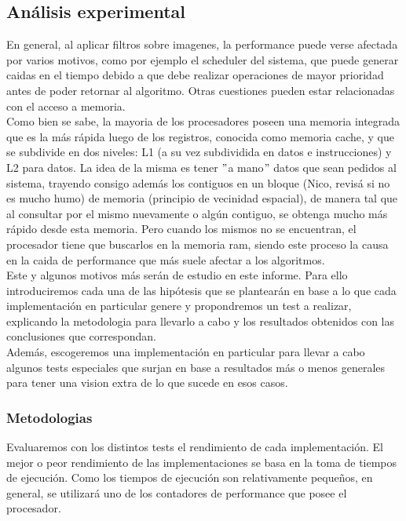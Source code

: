\subsection{Análisis experimental}

En general, al aplicar filtros sobre imagenes, la performance puede verse afectada por varios motivos, como por ejemplo el scheduler del sistema, que puede generar caidas en el tiempo debido a que debe realizar operaciones de mayor prioridad antes de poder retornar al algoritmo. Otras cuestiones pueden estar relacionadas con el acceso a memoria.\\

Como bien se sabe, la mayoria de los procesadores poseen una memoria integrada que es la más rápida luego de los registros, conocida como memoria cache, y que se subdivide en dos niveles: L1 (a su vez subdividida en datos e instrucciones) y L2 para datos. 
La idea de la misma es tener $"$a mano$"$ datos que sean pedidos al sistema, trayendo consigo además los contiguos en un bloque (Nico, revisá si no es mucho humo) de memoria (principio de vecinidad espacial), de manera tal que al consultar por el mismo nuevamente o algún contiguo, se obtenga mucho más rápido desde esta memoria. Pero cuando los mismos no se encuentran, el procesador tiene que buscarlos en la memoria ram, siendo este proceso la causa en la caida de performance que más suele afectar a los algoritmos.\\ 

Este y algunos motivos más serán de estudio en este informe. Para ello introduciremos cada una de las hipótesis que se plantearán en base a lo que cada implementación en particular genere y propondremos un test a realizar, explicando la metodologia para llevarlo a cabo y los resultados obtenidos con las conclusiones que correspondan.\\
 
Además, escogeremos una implementación en particular para llevar a cabo algunos tests especiales que surjan en base a resultados más o menos generales para tener una vision extra de lo que sucede en esos casos.\\

\subsubsection{Metodologias}

Evaluaremos con los distintos tests el rendimiento de cada implementación. El mejor o peor rendimiento de las implementaciones se basa en la toma de tiempos de ejecución. Como los tiempos de ejecución son relativamente pequeños, en general, se utilizará uno de los contadores de performance que posee el procesador. \\

